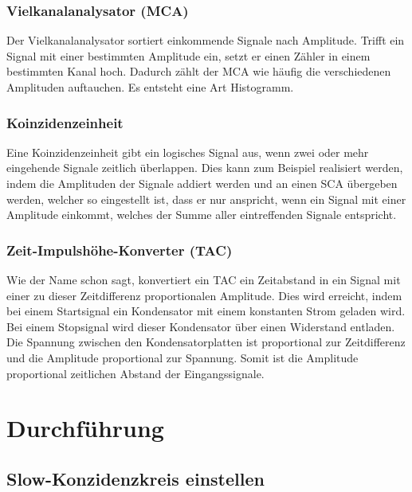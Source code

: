 \subsection{Vielkanalanalysator (MCA)}

Der Vielkanalanalysator sortiert einkommende Signale nach Amplitude. Trifft ein
Signal mit einer bestimmten Amplitude ein, setzt er einen Zähler in einem
bestimmten Kanal hoch. Dadurch zählt der MCA wie häufig die verschiedenen
Amplituden auftauchen. Es entsteht eine Art Histogramm.

\subsection{Koinzidenzeinheit}

Eine Koinzidenzeinheit gibt ein logisches Signal aus, wenn zwei oder mehr
eingehende Signale zeitlich überlappen. Dies kann zum Beispiel realisiert
werden, indem die Amplituden der Signale addiert werden und an einen SCA
übergeben werden, welcher so eingestellt ist, dass er nur anspricht, wenn ein
Signal mit einer Amplitude einkommt, welches der Summe aller eintreffenden
Signale entspricht.

\subsection{Zeit-Impulshöhe-Konverter (TAC)}

Wie der Name schon sagt, konvertiert ein TAC ein Zeitabstand in ein Signal mit
einer zu dieser Zeitdifferenz proportionalen Amplitude. Dies wird erreicht,
indem bei einem Startsignal ein Kondensator mit einem konstanten Strom geladen
wird. Bei einem Stopsignal wird dieser Kondensator über einen Widerstand
entladen. Die Spannung zwischen den Kondensatorplatten ist proportional zur
Zeitdifferenz und die Amplitude proportional zur Spannung. Somit ist die
Amplitude proportional zeitlichen Abstand der Eingangssignale.


\chapter{Durchführung}

\section{Slow-Konzidenzkreis einstellen}

